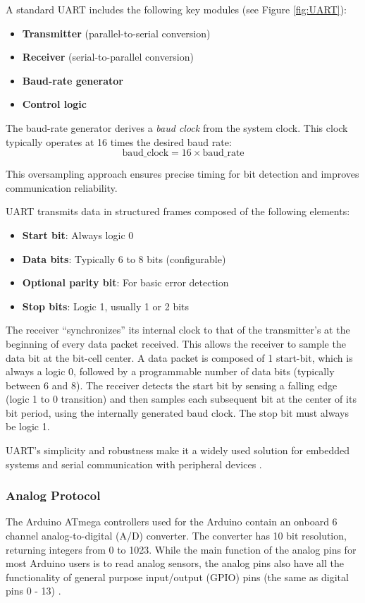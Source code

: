 {{{{{A standard UART includes the following key modules (see Figure  \ref{fig:UART}):
\begin{itemize}
	\item \textbf{Transmitter} (parallel-to-serial conversion)
	\item \textbf{Receiver} (serial-to-parallel conversion)
	\item \textbf{Baud-rate generator}
	\item \textbf{Control logic}
\end{itemize}

The baud-rate generator derives a \textit{baud clock} from the system clock. This clock typically operates at 16 times the desired baud rate:
\[
\text{baud\_clock} = 16 \times \text{baud\_rate}
\]

This oversampling approach ensures precise timing for bit detection and improves communication reliability.

UART transmits data in structured frames composed of the following elements:
\begin{itemize}
	\item \textbf{Start bit}: Always logic 0
	\item \textbf{Data bits}: Typically 6 to 8 bits (configurable)
	\item \textbf{Optional parity bit}: For basic error detection
	\item \textbf{Stop bits}: Logic 1, usually 1 or 2 bits
\end{itemize}

The receiver “synchronizes” its internal clock to that of the transmitter's at the beginning of every data packet received. This allows the receiver to sample the data bit at the bit-cell center. A data packet is composed of 1 start-bit, which is always a logic 0, followed by a programmable number of data bits (typically between 6 and 8). The receiver detects the start bit by sensing a falling edge (logic 1 to 0 transition) and then samples each subsequent bit at the center of its bit period, using the internally generated baud clock. The stop bit must always be logic 1.

UART’s simplicity and robustness make it a widely used solution for embedded systems and serial communication with peripheral devices \cite{Ali2004}.

	}
	
	\subsubsection{Analog Protocol}
	{
The Arduino ATmega controllers used for the Arduino contain an onboard 6 channel analog-to-digital (A/D) converter. The converter has 10 bit resolution, returning integers from 0 to 1023. While the main function of the analog pins for most Arduino users is to read analog sensors, the analog pins also have all the functionality of general purpose input/output (GPIO) pins (the same as digital pins 0 - 13) \cite{ArduinoAnalogInput}.

}}}}}
